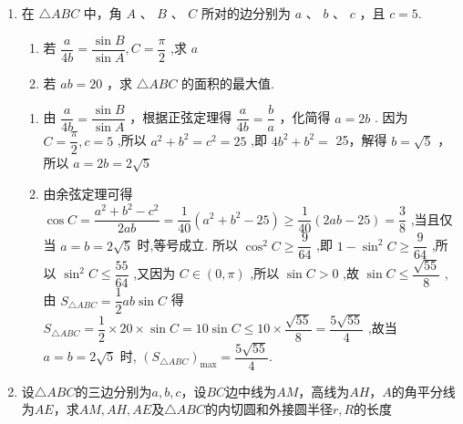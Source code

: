 \begin{enumerate}
    \item 在 $\bigtriangleup  {ABC}$ 中，角 $A$ 、 $B$ 、 $C$ 所对的边分别为 $a$ 、 $b$ 、 $c$ ，且 $c = 5$.
    \begin{enumerate}
        \item 若 $\dfrac{a}{4b} = \dfrac{\sin B}{\sin A},C = \dfrac{\pi }{2}$ ,求 $a$
        \item 若 ${ab} = {20}$ ，求 $\bigtriangleup  {ABC}$ 的面积的最大值.
    \end{enumerate}
    \begin{jieda}
        \begin{enumerate}
            \item 由 $\dfrac{a}{4b} = \dfrac{\sin B}{\sin A}$ ，根据正弦定理得 $\dfrac{a}{4b} = \dfrac{b}{a}$ ，化简得 $a =  {2b}$ . 因为 $C = \dfrac{\pi }{2},c = 5$ ,所以 ${a}^{2} + {b}^{2} = {c}^{2} = {25}$ ,即 $4{b}^{2} + {b}^{2} =$ 25，解得 $b = \sqrt{5}$ ，所以 $a = {2b} = {2\sqrt{5}}$
            \item 由余弦定理可得 $\cos C = \dfrac{{a}^{2} + {b}^{2} - {c}^{2}}{2ab} = \dfrac{1}{40}\left( {{a}^{2} + {b}^{2} - {25}}\right)  \geq  \dfrac{1}{40}\left( {{2ab} - {25}}\right)  = \dfrac{3}{8}$ ,当且仅当 $a = b = 2\sqrt{5}$ 时,等号成立. 所以 ${\cos }^{2}C \geq  \dfrac{9}{64}$ ,即 $1 - {\sin }^{2}C \geq  \dfrac{9}{64}$ ,所以 ${\sin }^{2}C \leq  \dfrac{55}{64}$ ,又因为 $C \in  \left( {0,\pi }\right)$ ,所以 $\sin C > 0$ ,故 $\sin C \leq  \dfrac{\sqrt{55}}{8}$ ,由 ${S}_{\bigtriangleup {ABC}} =  \dfrac{1}{2}{ab}\sin C$ 得 ${S}_{\bigtriangleup {ABC}} = \dfrac{1}{2} \times  {20} \times  \sin C = {10}\sin C \leq  {10} \times  \dfrac{\sqrt{55}}{8} =  \dfrac{5\sqrt{55}}{4}$ ,故当 $a = b = 2\sqrt{5}$ 时, ${\left( {S}_{\bigtriangleup {ABC}}\right) }_{\max } = \dfrac{5\sqrt{55}}{4}$.
        \end{enumerate}
    \end{jieda}

    \item 设$\triangle ABC$的三边分别为$a, b, c$，设$BC$边中线为$AM$，高线为$AH$，$A$的角平分线为$AE$，求$AM, AH, AE$及$\triangle ABC$的内切圆和外接圆半径$r, R$的长度
    \begin{jieda}
\end{jieda}
\end{enumerate}
